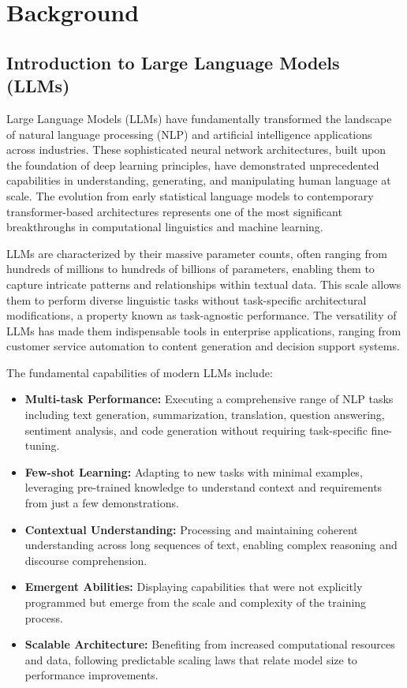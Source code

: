 
\chapter{Background}

\section{Introduction to Large Language Models (LLMs)}

Large Language Models (LLMs) have fundamentally transformed the landscape of natural language processing (NLP) and artificial intelligence applications across industries. These sophisticated neural network architectures, built upon the foundation of deep learning principles, have demonstrated unprecedented capabilities in understanding, generating, and manipulating human language at scale. The evolution from early statistical language models to contemporary transformer-based architectures represents one of the most significant breakthroughs in computational linguistics and machine learning.

LLMs are characterized by their massive parameter counts, often ranging from hundreds of millions to hundreds of billions of parameters, enabling them to capture intricate patterns and relationships within textual data. This scale allows them to perform diverse linguistic tasks without task-specific architectural modifications, a property known as task-agnostic performance. The versatility of LLMs has made them indispensable tools in enterprise applications, ranging from customer service automation to content generation and decision support systems.

The fundamental capabilities of modern LLMs include:

\begin{itemize}
    \item \textbf{Multi-task Performance:} Executing a comprehensive range of NLP tasks including text generation, summarization, translation, question answering, sentiment analysis, and code generation without requiring task-specific fine-tuning.
    \item \textbf{Few-shot Learning:} Adapting to new tasks with minimal examples, leveraging pre-trained knowledge to understand context and requirements from just a few demonstrations.
    \item \textbf{Contextual Understanding:} Processing and maintaining coherent understanding across long sequences of text, enabling complex reasoning and discourse comprehension.
    \item \textbf{Emergent Abilities:} Displaying capabilities that were not explicitly programmed but emerge from the scale and complexity of the training process.
    \item \textbf{Scalable Architecture:} Benefiting from increased computational resources and data, following predictable scaling laws that relate model size to performance improvements.
\end{itemize}

